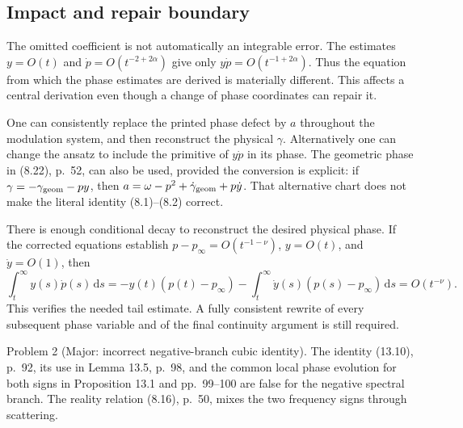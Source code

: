 \documentclass[10pt]{article}
\begin{document}
\subsection*{Impact and repair boundary}
The omitted coefficient is not automatically an integrable error. The estimates \(y=O(t)\) and \(\dot p=O(t^{-2+2\alpha})\) give only \(y\dot p=O(t^{-1+2\alpha})\). Thus the equation from which the phase estimates are derived is materially different. This affects a central derivation even though a change of phase coordinates can repair it.\par
One can consistently replace the printed phase defect by \(a\) throughout the modulation system, and then reconstruct the physical \(\gamma\). Alternatively one can change the ansatz to include the primitive of \(y\dot p\) in its phase. The geometric phase in (8.22), p. 52, can also be used, provided the conversion is explicit: if \(\gamma=-\gamma_{\rm geom}-py\), then \(a=\omega-p^2+\dot\gamma_{\rm geom}+p\dot y\). That alternative chart does not make the literal identity (8.1)–(8.2) correct.\par
There is enough conditional decay to reconstruct the desired physical phase. If the corrected equations establish \(p-p_\infty=O(t^{-1-\nu})\), \(y=O(t)\), and \(\dot y=O(1)\), then \[\int_t^\infty y(s)\dot p(s)\,\mathrm ds
 =-y(t)(p(t)-p_\infty)
   -\int_t^\infty\dot y(s)(p(s)-p_\infty)\,\mathrm ds
 =O(t^{-\nu}).\] This verifies the needed tail estimate. A fully consistent rewrite of every subsequent phase variable and of the final continuity argument is still required.\par
Problem 2 (Major: incorrect negative-branch cubic identity).  The identity (13.10), p. 92, its use in Lemma 13.5, p. 98, and the common local phase evolution for both signs in Proposition 13.1 and pp. 99–100 are false for the negative spectral branch. The reality relation (8.16), p. 50, mixes the two frequency signs through scattering.\par
\end{document}
